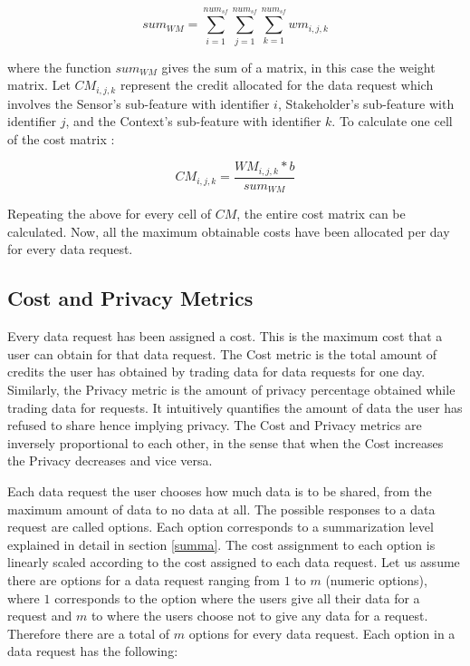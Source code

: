 \begin{equation}
sum_{WM} = \sum\limits_{i=1}^{num_{sf}} \sum\limits_{j=1}^{num_{sf}} \sum\limits_{k=1}^{num_{sf}} wm_{i,j,k}
\end{equation}

where the function $sum_{WM}$ gives the sum of a matrix, in this case the weight matrix.
Let $CM_{i,j,k}$ represent the credit allocated for the data request which involves the Sensor's sub-feature with identifier $i$, Stakeholder's sub-feature with identifier $j$, and the Context's sub-feature with identifier $k$. To calculate one cell of the cost matrix :

\begin{equation}
CM_{i,j,k} = \frac{WM_{i,j,k} * b}{sum_{WM}}
\end{equation}

Repeating the above for every cell of $CM$, the entire cost matrix can be calculated. Now, all the maximum obtainable costs have been allocated per day for every data request.

\subsection{Cost and Privacy Metrics} \label{o}
Every data request has been assigned a cost. This is the maximum cost that a user can obtain for that data request.
The Cost metric is the total amount of credits the user has obtained by trading data for data requests for one day. Similarly, the Privacy metric is the amount of privacy percentage obtained while trading data for requests. It intuitively quantifies the amount of data the user has refused to share hence implying privacy. The Cost and Privacy metrics are inversely proportional to each other, in the sense that when the Cost increases the Privacy decreases and vice versa.

Each data request the user chooses how much data is to be shared, from the maximum amount of data to no data at all. The possible responses to a data request are called options. Each option corresponds to a summarization level explained in detail in section \ref{summa}. The cost assignment to each option is linearly scaled according
to the cost assigned to each data request. Let us assume there are options for a data request ranging from $1$ to $m$ (numeric options), where $1$ corresponds to the option where the users give all their data for a request and $m$ to where the users choose not to give any data for a request. Therefore there are a total of $m$ options for every data request. Each option in a data request has the following:

